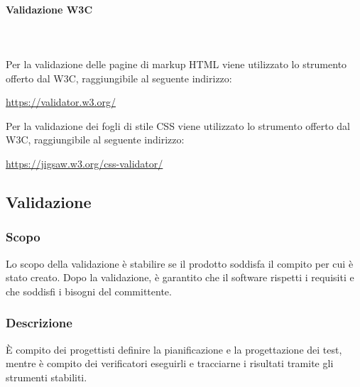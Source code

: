 		\paragraph{Validazione W3C} \mbox{}\\ \mbox{}\\
		Per la validazione delle pagine di markup HTML viene utilizzato lo strumento offerto dal W3C, raggiungibile al seguente indirizzo: \newline
		\centerline{\url{https://validator.w3.org/}} \newline \newline
		Per la validazione dei fogli di stile CSS viene utilizzato lo strumento offerto dal W3C, raggiungibile al seguente indirizzo: \newline
		\centerline{\url{https://jigsaw.w3.org/css-validator/}} \newline


\subsection{Validazione}
	\subsubsection{Scopo}
	Lo scopo della validazione è stabilire se il prodotto soddisfa il compito per cui è stato creato. Dopo la validazione, è garantito che il software rispetti i requisiti e che soddisfi i bisogni del committente.

	\subsubsection{Descrizione}
	\`E compito dei progettisti definire la pianificazione e la progettazione dei test, mentre è compito dei verificatori eseguirli e tracciarne i risultati tramite gli strumenti stabiliti.
